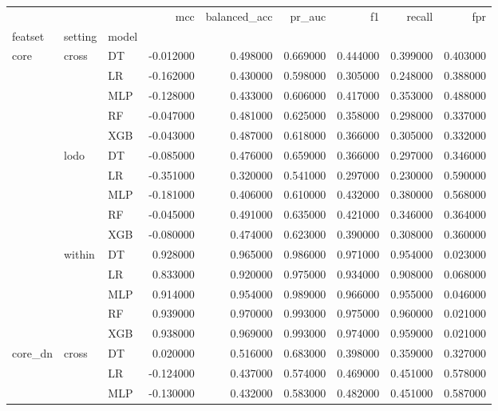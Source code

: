 \begin{tabular}{lllrrrrrr}
\toprule
 &  &  & mcc & balanced_acc & pr_auc & f1 & recall & fpr \\
featset & setting & model &  &  &  &  &  &  \\
\midrule
\multirow[t]{15}{*}{core} & \multirow[t]{5}{*}{cross} & DT & -0.012000 & 0.498000 & 0.669000 & 0.444000 & 0.399000 & 0.403000 \\
 &  & LR & -0.162000 & 0.430000 & 0.598000 & 0.305000 & 0.248000 & 0.388000 \\
 &  & MLP & -0.128000 & 0.433000 & 0.606000 & 0.417000 & 0.353000 & 0.488000 \\
 &  & RF & -0.047000 & 0.481000 & 0.625000 & 0.358000 & 0.298000 & 0.337000 \\
 &  & XGB & -0.043000 & 0.487000 & 0.618000 & 0.366000 & 0.305000 & 0.332000 \\
\cline{2-9}
 & \multirow[t]{5}{*}{lodo} & DT & -0.085000 & 0.476000 & 0.659000 & 0.366000 & 0.297000 & 0.346000 \\
 &  & LR & -0.351000 & 0.320000 & 0.541000 & 0.297000 & 0.230000 & 0.590000 \\
 &  & MLP & -0.181000 & 0.406000 & 0.610000 & 0.432000 & 0.380000 & 0.568000 \\
 &  & RF & -0.045000 & 0.491000 & 0.635000 & 0.421000 & 0.346000 & 0.364000 \\
 &  & XGB & -0.080000 & 0.474000 & 0.623000 & 0.390000 & 0.308000 & 0.360000 \\
\cline{2-9}
 & \multirow[t]{5}{*}{within} & DT & 0.928000 & 0.965000 & 0.986000 & 0.971000 & 0.954000 & 0.023000 \\
 &  & LR & 0.833000 & 0.920000 & 0.975000 & 0.934000 & 0.908000 & 0.068000 \\
 &  & MLP & 0.914000 & 0.954000 & 0.989000 & 0.966000 & 0.955000 & 0.046000 \\
 &  & RF & 0.939000 & 0.970000 & 0.993000 & 0.975000 & 0.960000 & 0.021000 \\
 &  & XGB & 0.938000 & 0.969000 & 0.993000 & 0.974000 & 0.959000 & 0.021000 \\
\cline{1-9} \cline{2-9}
\multirow[t]{15}{*}{core_dn} & \multirow[t]{5}{*}{cross} & DT & 0.020000 & 0.516000 & 0.683000 & 0.398000 & 0.359000 & 0.327000 \\
 &  & LR & -0.124000 & 0.437000 & 0.574000 & 0.469000 & 0.451000 & 0.578000 \\
 &  & MLP & -0.130000 & 0.432000 & 0.583000 & 0.482000 & 0.451000 & 0.587000 \\

\end{tabular}
